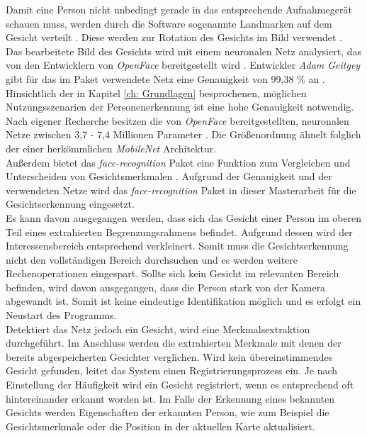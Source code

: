 	Damit eine Person nicht unbedingt gerade in das entsprechende Aufnahmegerät schauen muss, werden durch die Software sogenannte Landmarken auf dem Gesicht verteilt \cite{facerecarticle}. Diese werden zur Rotation des Gesichts im Bild verwendet \cite{facerecarticle}. \\
	
	Das bearbeitete Bild des Gesichts wird mit einem neuronalen Netz analysiert, das von den Entwicklern von \textit{OpenFace} bereitgestellt wird \cite{facerecarticle}. Entwickler \textit{Adam Geitgey} gibt für das im Paket verwendete Netz eine Genauigkeit von 99,38 \% an \cite{facerecognition}. Hinsichtlich der in Kapitel \ref{ch: Grundlagen} besprochenen, möglichen Nutzungsszenarien der Personenerkennung ist eine hohe Genauigkeit notwendig. \\
	
	Nach eigener Recherche besitzen die von \textit{OpenFace} bereitgestellten, neuronalen Netze zwischen 3,7 - 7,4 Millionen Parameter \cite{openface}. Die Größenordnung ähnelt folglich der einer herkömmlichen \textit{MobileNet} Architektur.\\
	
	Außerdem bietet das \textit{face-recognition} Paket eine Funktion zum Vergleichen und Unterscheiden von Gesichtsmerkmalen \cite{facerecarticle}. Aufgrund der Genauigkeit und der verwendeten Netze wird das \textit{face-recognition} Paket in dieser Masterarbeit für die Gesichtserkennung eingesetzt.\\
	
	Es kann davon ausgegangen werden, dass sich das Gesicht einer Person im oberen Teil eines extrahierten Begrenzungsrahmens befindet. Aufgrund dessen wird der Interessensbereich entsprechend verkleinert. Somit muss die Gesichtserkennung nicht den vollständigen Bereich durchsuchen und es werden weitere Rechenoperationen eingespart. Sollte sich kein Gesicht im relevanten Bereich befinden, wird davon ausgegangen, dass die Person stark von der Kamera abgewandt ist. Somit ist keine eindeutige Identifikation möglich und es erfolgt ein Neustart des Programms.\\
	
	Detektiert das Netz jedoch ein Gesicht, wird eine Merkmalsextraktion durchgeführt. Im Anschluss werden die extrahierten Merkmale mit denen der bereits abgespeicherten Gesichter verglichen. Wird kein übereinstimmendes Gesicht gefunden, leitet das System einen Registrierungsprozess ein. Je nach Einstellung der Häufigkeit wird ein Gesicht registriert, wenn es entsprechend oft hintereinander erkannt worden ist. Im Falle der Erkennung eines bekannten Gesichts werden Eigenschaften der erkannten Person, wie zum Beispiel die Gesichtsmerkmale oder die Position in der aktuellen Karte aktualisiert. \\ 
	

